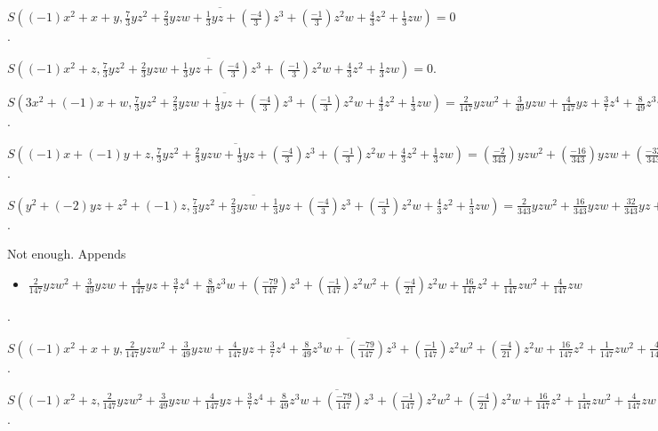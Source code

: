 $\overline{S((-1)x^{2}+x+y, \frac{7}{3}yz^{2}+\frac{2}{3}yzw+\frac{1}{3}yz+(\frac{-4}{3})z^{3}+(\frac{-1}{3})z^{2}w+\frac{4}{3}z^{2}+\frac{1}{3}zw)} = 0$.

$\overline{S((-1)x^{2}+z, \frac{7}{3}yz^{2}+\frac{2}{3}yzw+\frac{1}{3}yz+(\frac{-4}{3})z^{3}+(\frac{-1}{3})z^{2}w+\frac{4}{3}z^{2}+\frac{1}{3}zw)} = 0$.

$\overline{S(3x^{2}+(-1)x+w, \frac{7}{3}yz^{2}+\frac{2}{3}yzw+\frac{1}{3}yz+(\frac{-4}{3})z^{3}+(\frac{-1}{3})z^{2}w+\frac{4}{3}z^{2}+\frac{1}{3}zw)} = \frac{2}{147}yzw^{2}+\frac{3}{49}yzw+\frac{4}{147}yz+\frac{3}{7}z^{4}+\frac{8}{49}z^{3}w+(\frac{-79}{147})z^{3}+(\frac{-1}{147})z^{2}w^{2}+(\frac{-4}{21})z^{2}w+\frac{16}{147}z^{2}+\frac{1}{147}zw^{2}+\frac{4}{147}zw$.

$\overline{S((-1)x+(-1)y+z, \frac{7}{3}yz^{2}+\frac{2}{3}yzw+\frac{1}{3}yz+(\frac{-4}{3})z^{3}+(\frac{-1}{3})z^{2}w+\frac{4}{3}z^{2}+\frac{1}{3}zw)} = (\frac{-2}{343})yzw^{2}+(\frac{-16}{343})yzw+(\frac{-32}{343})yz+(\frac{-9}{49})z^{4}+(\frac{-24}{343})z^{3}w+\frac{142}{343}z^{3}+\frac{1}{343}z^{2}w^{2}+\frac{8}{49}z^{2}w+(\frac{-79}{343})z^{2}+(\frac{-1}{343})zw^{2}+(\frac{-32}{343})zw$.

$\overline{S(y^{2}+(-2)yz+z^{2}+(-1)z, \frac{7}{3}yz^{2}+\frac{2}{3}yzw+\frac{1}{3}yz+(\frac{-4}{3})z^{3}+(\frac{-1}{3})z^{2}w+\frac{4}{3}z^{2}+\frac{1}{3}zw)} = \frac{2}{343}yzw^{2}+\frac{16}{343}yzw+\frac{32}{343}yz+\frac{9}{49}z^{4}+\frac{24}{343}z^{3}w+(\frac{-142}{343})z^{3}+(\frac{-1}{343})z^{2}w^{2}+(\frac{-8}{49})z^{2}w+\frac{79}{343}z^{2}+\frac{1}{343}zw^{2}+\frac{32}{343}zw$.

Not enough.  Appends \begin{itemize}
\item $\frac{2}{147}yzw^{2}+\frac{3}{49}yzw+\frac{4}{147}yz+\frac{3}{7}z^{4}+\frac{8}{49}z^{3}w+(\frac{-79}{147})z^{3}+(\frac{-1}{147})z^{2}w^{2}+(\frac{-4}{21})z^{2}w+\frac{16}{147}z^{2}+\frac{1}{147}zw^{2}+\frac{4}{147}zw$
\end{itemize}  .


$\overline{S((-1)x^{2}+x+y, \frac{2}{147}yzw^{2}+\frac{3}{49}yzw+\frac{4}{147}yz+\frac{3}{7}z^{4}+\frac{8}{49}z^{3}w+(\frac{-79}{147})z^{3}+(\frac{-1}{147})z^{2}w^{2}+(\frac{-4}{21})z^{2}w+\frac{16}{147}z^{2}+\frac{1}{147}zw^{2}+\frac{4}{147}zw)} = (\frac{-63}{2})z^{5}+(-21)z^{4}w+35z^{4}+(\frac{-7}{2})z^{3}w^{2}+21z^{3}w+(\frac{-7}{2})z^{3}+\frac{7}{2}z^{2}w^{2}$.

$\overline{S((-1)x^{2}+z, \frac{2}{147}yzw^{2}+\frac{3}{49}yzw+\frac{4}{147}yz+\frac{3}{7}z^{4}+\frac{8}{49}z^{3}w+(\frac{-79}{147})z^{3}+(\frac{-1}{147})z^{2}w^{2}+(\frac{-4}{21})z^{2}w+\frac{16}{147}z^{2}+\frac{1}{147}zw^{2}+\frac{4}{147}zw)} = (\frac{-63}{2})z^{5}+(-21)z^{4}w+35z^{4}+(\frac{-7}{2})z^{3}w^{2}+21z^{3}w+(\frac{-7}{2})z^{3}+\frac{7}{2}z^{2}w^{2}$.

